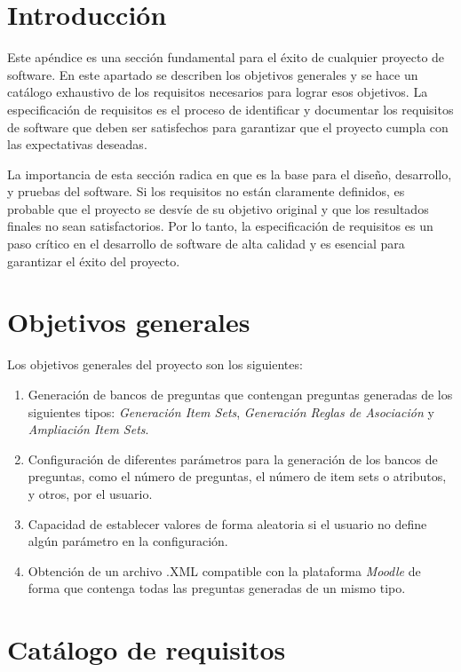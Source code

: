 
\section{Introducción}

Este apéndice es una sección fundamental para el éxito de cualquier proyecto de software. En este apartado se describen los objetivos generales y se hace un catálogo exhaustivo de los requisitos necesarios para lograr esos objetivos. La especificación de requisitos es el proceso de identificar y documentar los requisitos de software que deben ser satisfechos para garantizar que el proyecto cumpla con las expectativas deseadas.

La importancia de esta sección radica en que es la base para el diseño, desarrollo, y pruebas del software. Si los requisitos no están claramente definidos, es probable que el proyecto se desvíe de su objetivo original y que los resultados finales no sean satisfactorios. Por lo tanto, la especificación de requisitos es un paso crítico en el desarrollo de software de alta calidad y es esencial para garantizar el éxito del proyecto. \cite{wiki:requisitos}

\section{Objetivos generales}

Los objetivos generales del proyecto son los siguientes:

\begin{enumerate}
\item Generación de bancos de preguntas que contengan preguntas generadas de los siguientes tipos: \textit{Generación Item Sets}, \textit{Generación Reglas de Asociación} y \textit{Ampliación Item Sets}.
\item Configuración de diferentes parámetros para la generación de los bancos de preguntas, como el número de preguntas, el número de item sets o atributos, y otros, por el usuario.
\item Capacidad de establecer valores de forma aleatoria si el usuario no define algún parámetro en la configuración.
\item Obtención de un archivo .XML compatible con la plataforma \textit{Moodle} de forma que contenga todas las preguntas generadas de un mismo tipo.
\end{enumerate}

\section{Catálogo de requisitos}\label{catalogo-de-requisitos}

